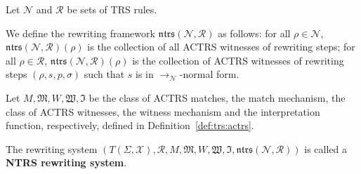 \begin{definition}
  Let $\mathcal{N}$ and $\mathcal{R}$ be sets of TRS rules.

  We define the rewriting framework $\mathfrak{ntrs}(\mathcal{N},\mathcal{R})$ as follows: for all $\rho \mathop{\in} \mathcal{N}$, $\mathfrak{ntrs}(\mathcal{N},\mathcal{R})(\rho)$ is the collection of all ACTRS witnesses of rewriting steps; for all $\rho \mathop{\in} \mathcal{R}$, $\mathfrak{ntrs}(\mathcal{N},\mathcal{R})(\rho)$ is the collection of ACTRS witnesses of rewriting steps $(\rho, s, p, \sigma)$ such that $s$ is in $\to_\mathcal{N}$-normal form.

  Let $M, \mathfrak{M}, W, \mathfrak{W}, \mathfrak{I}$ be the class of ACTRS matches, the match mechanism, the class of ACTRS witnesses, the witness mechanism and the interpretation function, respectively, defined in Definition~\ref{def:trs:actrs}.

  The rewriting system $(T(\Sigma,\mathcal{X}), \mathcal{R}, M, \mathfrak{M}, W, \mathfrak{W}, \mathfrak{I}, \mathfrak{ntrs}(\mathcal{N},\mathcal{R}))$ is called a \textbf{NTRS rewriting system}.
\end{definition}




        


